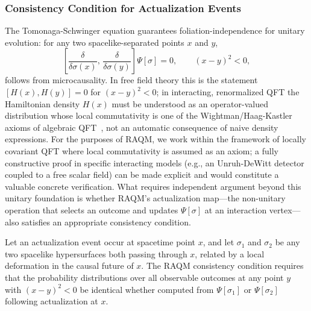 \documentclass[11pt,a4paper]{article}
\theoremstyle{plain}
\theoremstyle{definition}
\theoremstyle{remark}
\begin{document}
\subsubsection{Consistency Condition for Actualization Events}
\label{sec:consistency}

The Tomonaga-Schwinger equation guarantees foliation-independence for unitary
evolution: for any two spacelike-separated points $x$ and $y$,
\begin{equation}
  \left[\frac{\delta}{\delta\sigma(x)},\,
        \frac{\delta}{\delta\sigma(y)}\right]\Psi[\sigma] = 0,
  \qquad (x-y)^2 < 0,
\end{equation}
follows from microcausality. In free field theory this is the statement $[H(x),
H(y)] = 0$ for $(x-y)^2 < 0$; in interacting, renormalized QFT the Hamiltonian
density $H(x)$ must be understood as an operator-valued distribution whose local
commutativity is one of the Wightman/Haag-Kastler axioms of algebraic
QFT~\citep{HaagKastler1964}, not an automatic consequence of naive density
expressions. For the purposes of RAQM, we work within the framework of locally
covariant QFT where local commutativity is assumed as an axiom; a fully
constructive proof in specific interacting models (e.g., an Unruh-DeWitt detector
coupled to a free scalar field) can be made explicit and would constitute a
valuable concrete verification. What requires independent argument beyond this
unitary foundation is whether RAQM's actualization map---the non-unitary operation
that selects an outcome and updates $\Psi[\sigma]$ at an interaction vertex---also
satisfies an appropriate consistency condition.

Let an actualization event occur at spacetime point $x$, and let $\sigma_1$ and
$\sigma_2$ be any two spacelike hypersurfaces both passing through $x$, related by
a local deformation in the causal future of $x$. The RAQM consistency condition
requires that the probability distributions over all observable outcomes at any
point $y$ with $(x-y)^2 < 0$ be identical whether computed from $\Psi[\sigma_1]$
or $\Psi[\sigma_2]$ following actualization at $x$.
\end{document}
